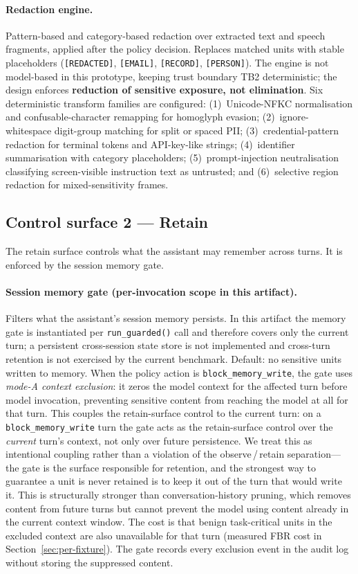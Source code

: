 \documentclass[pdflatex,sn-mathphys-num]{sn-jnl}
\begin{document}
\paragraph{Redaction engine.}
Pattern-based and category-based redaction over extracted text and speech
fragments, applied after the policy decision. Replaces matched units with
stable placeholders (\texttt{[REDACTED]}, \texttt{[EMAIL]}, \texttt{[RECORD]},
\texttt{[PERSON]}). The engine is not model-based in this prototype, keeping
trust boundary TB2 deterministic; the design enforces \textbf{reduction of
sensitive exposure, not elimination}. Six deterministic transform families are
configured: (1)~Unicode-NFKC normalisation and confusable-character remapping
for homoglyph evasion; (2)~ignore-whitespace digit-group matching for split or
spaced PII; (3)~credential-pattern redaction for terminal tokens and
API-key-like strings; (4)~identifier summarisation with category placeholders;
(5)~prompt-injection neutralisation classifying screen-visible instruction text
as untrusted; and (6)~selective region redaction for mixed-sensitivity frames.

\subsection{Control surface 2 --- Retain}\label{sec:retain}

The retain surface controls what the assistant may remember across turns. It is
enforced by the session memory gate.

\paragraph{Session memory gate (per-invocation scope in this artifact).}
Filters what the assistant's session memory persists. In this artifact the
memory gate is instantiated per \texttt{run\_guarded()} call and therefore
covers only the current turn; a persistent cross-session state store is not
implemented and cross-turn retention is not exercised by the current
benchmark. Default: no sensitive
units written to memory. When the policy action is
\texttt{block\_memory\_write}, the gate uses \textit{mode-A context exclusion}:
it zeros the model context for the affected turn before model invocation,
preventing sensitive content from reaching the model at all for that turn.
This couples the retain-surface control to the current turn: on a
\texttt{block\_memory\_write} turn the gate acts as the retain-surface control
over the \textit{current} turn's context, not only over future persistence. We
treat this as intentional coupling rather than a violation of the
observe\,/\,retain separation---the gate is the surface responsible for
retention, and the strongest way to guarantee a unit is never retained is to
keep it out of the turn that would write it.
This is structurally stronger than conversation-history pruning, which removes
content from future turns but cannot prevent the model using content already in
the current context window. The cost is that benign task-critical units in the
excluded context are also unavailable for that turn (measured FBR cost in
Section~\ref{sec:per-fixture}). The gate records every exclusion event in the
audit log without storing the suppressed content.
\end{document}
